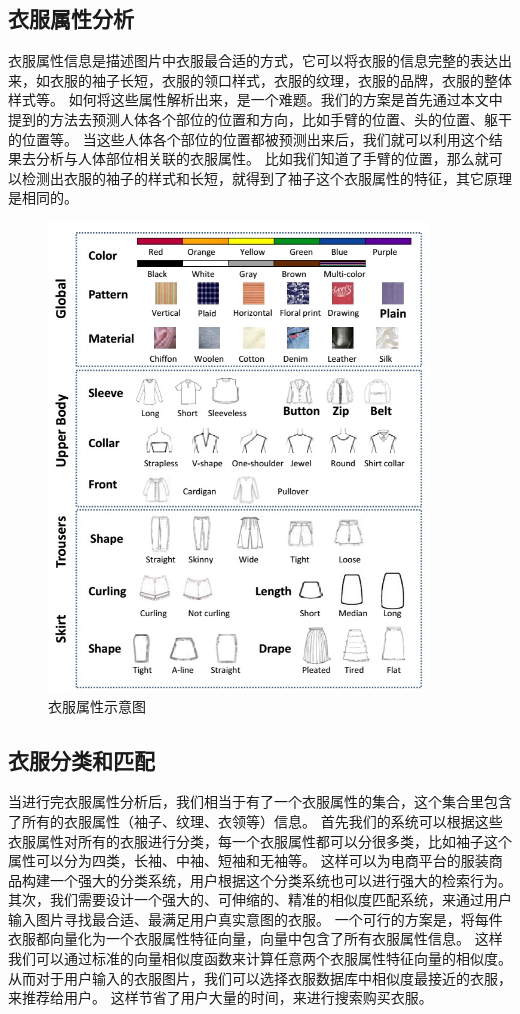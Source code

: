 \subsection{衣服属性分析}
衣服属性信息是描述图片中衣服最合适的方式，它可以将衣服的信息完整的表达出来，如衣服的袖子长短，衣服的领口样式，衣服的纹理，衣服的品牌，衣服的整体样式等。
如何将这些属性解析出来，是一个难题。我们的方案是首先通过本文中提到的方法去预测人体各个部位的位置和方向，比如手臂的位置、头的位置、躯干的位置等。
当这些人体各个部位的位置都被预测出来后，我们就可以利用这个结果去分析与人体部位相关联的衣服属性。
比如我们知道了手臂的位置，那么就可以检测出衣服的袖子的样式和长短，就得到了袖子这个衣服属性的特征，其它原理是相同的。

\begin{figure}
\centering
\includegraphics[width=0.9\textwidth]{img/attribute.jpg}
\caption{衣服属性示意图}
\label{fig:attribute}
\end{figure}

\subsection{衣服分类和匹配}
当进行完衣服属性分析后，我们相当于有了一个衣服属性的集合，这个集合里包含了所有的衣服属性（袖子、纹理、衣领等）信息。
首先我们的系统可以根据这些衣服属性对所有的衣服进行分类，每一个衣服属性都可以分很多类，比如袖子这个属性可以分为四类，长袖、中袖、短袖和无袖等。
这样可以为电商平台的服装商品构建一个强大的分类系统，用户根据这个分类系统也可以进行强大的检索行为。
其次，我们需要设计一个强大的、可伸缩的、精准的相似度匹配系统，来通过用户输入图片寻找最合适、最满足用户真实意图的衣服。
一个可行的方案是，将每件衣服都向量化为一个衣服属性特征向量，向量中包含了所有衣服属性信息。
这样我们可以通过标准的向量相似度函数来计算任意两个衣服属性特征向量的相似度。
从而对于用户输入的衣服图片，我们可以选择衣服数据库中相似度最接近的衣服，来推荐给用户。
这样节省了用户大量的时间，来进行搜索购买衣服。

